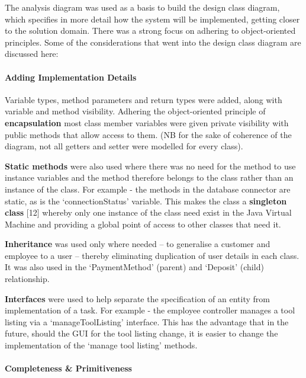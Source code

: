 \documentclass[fontsize=11pt]{extarticle}
\numberwithin{figure}{section} %
\numberwithin{table}{section}%
\let\oldparagraph\paragraph
\renewcommand{\paragraph}[1]{\oldparagraph{#1}\mbox{}}
\begin{document}
The analysis diagram was used as a basis to build the design class
diagram, which specifies in more detail how the system will be
implemented, getting closer to the solution domain. There was a strong
focus on adhering to object-oriented principles. Some of the
considerations that went into the design class diagram are discussed
here:

\hypertarget{adding-implementation-details}{%
\paragraph{Adding Implementation
Details}\label{adding-implementation-details}}

Variable types, method parameters and return types were added, along
with variable and method visibility. Adhering the object-oriented
principle of \textbf{encapsulation} most class member variables were
given private visibility with public methods that allow access to them.
(NB for the sake of coherence of the diagram, not all getters and setter
were modelled for every class).

\textbf{Static methods} were also used where there was no need for the
method to use instance variables and the method therefore belongs to the
class rather than an instance of the class. For example - the methods in
the database connector are static, as is the `connectionStatus'
variable. This makes the class a \textbf{singleton class} {[}12{]}
whereby only one instance of the class need exist in the Java Virtual
Machine and providing a global point of access to other classes that
need it.

\textbf{Inheritance} was used only where needed -- to generalise a
customer and employee to a user -- thereby eliminating duplication of
user details in each class. It was also used in the `PaymentMethod'
(parent) and `Deposit' (child) relationship.

\textbf{Interfaces} were used to help separate the specification of an
entity from implementation of a task. For example - the employee
controller manages a tool listing via a `manageToolListing' interface.
This has the advantage that in the future, should the GUI for the tool
listing change, it is easier to change the implementation of the `manage
tool listing' methods.

\hypertarget{completeness-primitiveness}{%
\paragraph{Completeness \&
Primitiveness}\label{completeness-primitiveness}}
\end{document}
